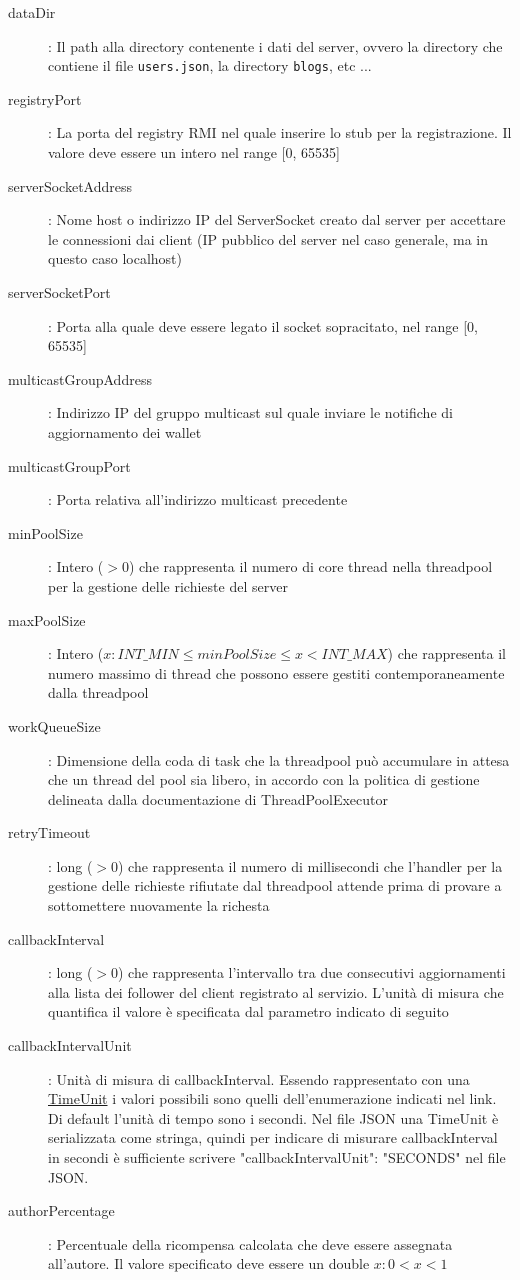 \begin{description}
	\item[dataDir]: Il path alla directory contenente i dati del server, ovvero la directory
	che contiene il file \verb|users.json|, la directory \verb|blogs|, etc ...
	\item[registryPort]: La porta del registry RMI nel quale inserire lo stub per la registrazione. Il valore deve essere un intero nel range [0, 65535]
	\item[serverSocketAddress]: Nome host o indirizzo IP del ServerSocket creato dal server per accettare le connessioni dai client (IP pubblico del server nel caso generale, ma in questo caso localhost)
	\item[serverSocketPort]: Porta alla quale deve essere legato il socket sopracitato, nel range [0, 65535]
	\item[multicastGroupAddress]: Indirizzo IP del gruppo multicast sul quale inviare le notifiche di aggiornamento dei wallet
	\item[multicastGroupPort]: Porta relativa all'indirizzo multicast precedente
	\item[minPoolSize]: Intero ($>0$) che rappresenta il numero di core thread nella threadpool per la gestione delle richieste del server
	\item[maxPoolSize]: Intero ($x : INT\_MIN \le minPoolSize \le x < INT\_MAX$) che rappresenta il numero massimo di thread che possono essere gestiti contemporaneamente dalla threadpool
	\item[workQueueSize]: Dimensione della coda di task che la threadpool può accumulare in attesa che un thread del pool sia libero, in accordo con la politica di gestione delineata dalla documentazione di ThreadPoolExecutor
	\item[retryTimeout]: long ($>0$) che rappresenta il numero di millisecondi che l'handler per la gestione delle richieste rifiutate dal threadpool attende prima di provare a sottomettere nuovamente la richesta
	\item[callbackInterval]: long ($>0$) che rappresenta l'intervallo tra due consecutivi aggiornamenti alla lista dei follower del client registrato al servizio. L'unità di misura che quantifica il valore è specificata dal parametro indicato di seguito
	\item[callbackIntervalUnit]: Unità di misura di callbackInterval. Essendo rappresentato con una\\
	\hyperref{https://docs.oracle.com/en/java/javase/11/docs/api/java.base/java/util/concurrent/TimeUnit.html#enum.constant.summary}{category}{name}{TimeUnit} i valori possibili sono quelli dell'enumerazione indicati nel link. Di default l'unità di tempo sono i secondi. Nel file JSON una TimeUnit è serializzata come stringa, quindi per indicare di misurare callbackInterval in secondi è sufficiente scrivere
	"callbackIntervalUnit": "SECONDS" nel file JSON.
	\item[authorPercentage]: Percentuale della ricompensa calcolata che deve essere assegnata all'autore. 
	Il valore specificato deve essere un double $x : 0 < x < 1$
\end{description}
